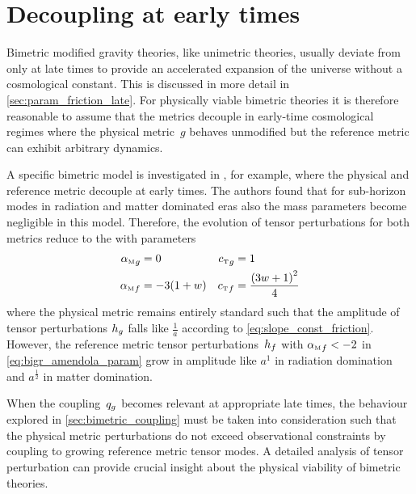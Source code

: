 \documentclass[12pt,parskip=half]{scrreprt}
\newcommand{\addref}{\todo[color=black!20]{ref.}}
\begin{document}


\section{Decoupling at early times}

Bimetric modified gravity theories, like unimetric theories, usually deviate from \LCDM only at late times to provide an accelerated expansion of the universe without a cosmological constant. \addref This is discussed in more detail in \autoref{sec:param_friction_late}. For physically viable bimetric theories it is therefore reasonable to assume that the metrics decouple in early-time cosmological regimes where the physical metric~\(g\) behaves unmodified but the reference metric can exhibit arbitrary dynamics.

A specific bimetric model is investigated in \cite{Amendola2015}, for example, where the physical and reference metric decouple at early times. The authors found that for sub-horizon modes in radiation and matter dominated eras also the mass parameters become negligible in this model. Therefore, the evolution of tensor perturbations for both metrics reduce to the  with parameters \citep{Amendola2015}
\begin{subequations}
\begin{align}
	\alphaMofmetr{g} &= 0 & \cTofmetr{g} &= 1 \\
	\alphaMofmetr{f} &= -3(1+\eosp) & \cTofmetr{f} &= \frac{\del{3\eosp + 1}^2}{4} \label{eq:bigr_amendola_param}
\end{align}
\end{subequations}
where the physical metric remains entirely standard such that the amplitude of tensor perturbations \(h_{g}\) falls like \(\frac{1}{a}\) according to \eqref{eq:slope_const_friction}. However, the reference metric tensor perturbations~\(h_{f}\) with \({\alpha_{\textnormal{\tiny{M}}}}_{f}<-2\) in \eqref{eq:bigr_amendola_param} grow in amplitude like \(a^1\) in radiation domination and \(a^\frac{1}{2}\) in matter domination.

When the coupling~\(q_{g}\) becomes relevant at appropriate late times, the behaviour explored in \autoref{sec:bimetric_coupling} must be taken into consideration such that the physical metric perturbations do not exceed observational constraints by coupling to growing reference metric tensor modes. A detailed analysis of tensor perturbation can provide crucial insight about the physical viability of bimetric theories. 
\end{document}

